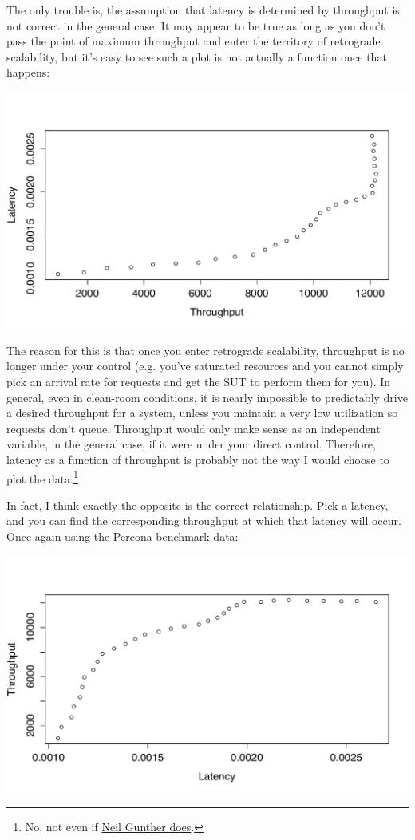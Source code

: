 \documentclass{vivid_layout}
\begin{document}
The only trouble is, the assumption that latency is determined by throughput is
not correct in the general case. It may appear to be true as long as you don't
pass the point of maximum throughput and enter the territory of retrograde
scalability, but it's easy to see such a plot is not actually a function once
that happens:
\begin{center}
\includegraphics[width=.85\linewidth]{scalability/not-a-function}
\end{center}

The reason for this is that once you enter retrograde scalability, throughput is
no longer under your control (e.g. you've saturated resources and you cannot
simply pick an arrival rate for requests and get the SUT to perform them for
you). In general, even in clean-room conditions, it is nearly impossible to
predictably drive a desired throughput for a system, unless you maintain a very
low utilization so requests don't queue. Throughput would only make sense as an
independent variable, in the general case, if it were under your direct control.
Therefore, latency as a function of throughput is probably not the way I would
choose to plot the data.\footnote{No, not even if
\href{http://perfdynamics.blogspot.nl/2015/07/hockey-elbow-and-other-response-time.html}{Neil Gunther does}.}

In fact, I think exactly the opposite is the correct relationship. Pick a
latency, and you can find the corresponding throughput at which that latency
will occur. Once again using the Percona benchmark data:
\begin{center}
\includegraphics[width=.85\linewidth]{scalability/latency-vs-throughput}
\end{center}
\end{document}
